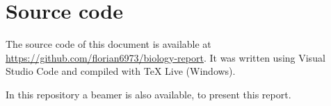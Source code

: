 \documentclass{article}
\begin{document}






    


    \newpage
    
    \nocite{*}
    \printbibliography

    \newpage

    \appendix

    \section {Source code}
        The source code of this document is available at \url{https://github.com/florian6973/biology-report}.
        It was written using Visual Studio Code and compiled with TeX Live (Windows).

        In this repository a beamer is also available, to present this report.
\end{document}
